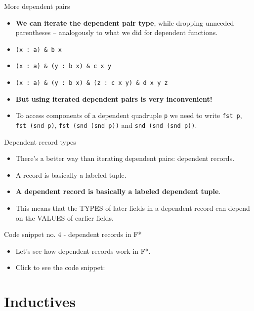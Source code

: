 \documentclass{beamer}
\newcommand{\m}[1]{\texttt{#1}}
\begin{document}
\begin{frame}{More dependent pairs}
\begin{itemize}
	\item \textbf{We can iterate the dependent pair type}, while dropping unneeded parentheses -- analogously to what we did for dependent functions.
	\item \m{(x :\ a) \& b x}
	\item \m{(x :\ a) \& (y :\ b x) \& c x y}
	\item \m{(x :\ a) \& (y :\ b x) \& (z :\ c x y) \& d x y z}
	\item \textbf{But using iterated dependent pairs is very inconvenient!}
	\item To access components of a dependent quadruple \m{p} we need to write \m{fst p}, \m{fst (snd p)}, \m{fst (snd (snd p))} and \m{snd (snd (snd p))}.
\end{itemize}
\end{frame}

\begin{frame}{Dependent record types}
\begin{itemize}
	\item There's a better way than iterating dependent pairs: dependent records.
	\item A record is basically a labeled tuple.
	\item \textbf{A dependent record is basically a labeled dependent tuple}.
	\item This means that the TYPES of later fields in a dependent record can depend on the VALUES of earlier fields.
\end{itemize}
\end{frame}

\begin{frame}{Code snippet no. 4 - dependent records in F*}
\begin{itemize}
	\item Let's see how dependent records work in F*.
	\item Click to see the code snippet: \href{https://github.com/wkolowski/Dependent-Types-and-Theorem-Proving/blob/master/Code/DependentRecords.fst}{\color{blue}{Code/DependentRecords.fst}}
\end{itemize}
\end{frame}

\section{Inductives}
\end{document}
